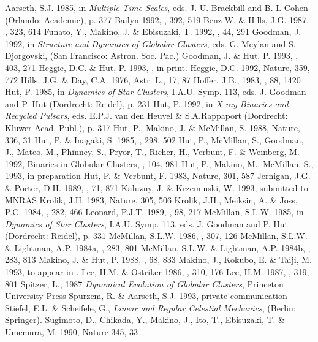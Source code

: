 \begin{references}
 Aarseth, S.J. 1985, in {\it Multiple Time Scales}, eds.
J. U. Brackbill and B. I. Cohen (Orlando: Academic), p. 377
 Bailyn 1992, \apj, 392, 519
 Benz W. \& Hills, J.G. 1987, \apj, 323, 614
 Funato, Y., Makino, J. \& Ebisuzaki, T. 1992, \pasj, 44, 291
 Goodman, J. 1992, in {\it Structure and Dynamics of
Globular Clusters}, eds. G. Meylan and S. Djorgovski, (San Francisco:
Astron. Soc. Pac.)
 Goodman, J. \& Hut, P. 1993, \apj, 403, 271
 Heggie, D.C. \& Hut, P. 1993, \apjs, in print.
 Heggie, D.C. 1992, Nature, 359, 772
 Hills, J.G. \& Day, C.A. 1976, Astr. L., 17, 87
 Hoffer, J.B., 1983, \aj, 88, 1420
 Hut, P. 1985, in {\it Dynamics of Star Clusters},
I.A.U. Symp. 113, eds. J. Goodman and P. Hut (Dordrecht: Reidel), p. 231
 Hut, P. 1992, in {\it X-ray Binaries and Recycled Pulsars},
eds. E.P.J. van den Heuvel \& S.A.Rappaport (Dordrecht: Kluwer Acad.
Publ.), p. 317
 Hut, P., Makino, J. \& McMillan, S. 1988, Nature, 336, 31
 Hut, P. \& Inagaki, S. 1985, \apj, 298, 502
 Hut, P., McMillan, S., Goodman, J., Mateo, M., Phinney, S.,
Pryor, T., Richer, H., Verbunt, F. \& Weinberg, M. 1992, Binaries in
Globular Clusters, \pasp, 104, 981
 Hut, P., Makino, M., McMillan, S., 1993, in preparation
 Hut, P. \& Verbunt, F. 1983, Nature, 301, 587
 Jernigan, J.G. \& Porter, D.H. 1989, \apjs, 71, 871
 Kaluzny, J. \& Krzeminski, W. 1993, submitted to MNRAS
 Krolik, J.H. 1983, Nature, 305, 506
 Krolik, J.H., Meiksin, A. \& Joss, P.C. 1984, \apj, 282, 466
 Leonard, P.J.T. 1989, \aj, 98, 217
 McMillan, S.L.W. 1985, in {\it Dynamics of Star Clusters},
I.A.U. Symp. 113, eds. J. Goodman and P. Hut (Dordrecht: Reidel), p. 331
 McMillan, S.L.W. 1986, \apj, 307, 126
 McMillan, S.L.W. \& Lightman, A.P. 1984a, \apj, 283, 801
 McMillan, S.L.W. \& Lightman, A.P. 1984b, \apj, 283, 813
 Makino, J. \& Hut, P. 1988, \apjs, 68, 833
 Makino, J., Kokubo, E. \& Taiji, M. 1993, to appear in \pasj.
 Lee, H.M. \& Ostriker 1986, \apj, 310, 176
 Lee, H.M. 1987, \apj, 319, 801
 Spitzer, L., 1987 {\it Dynamical Evolution of Globular
Clusters}, Princeton University Press
 Spurzem, R. \& Aarseth, S.J. 1993, private communication
 Stiefel, E.L. \& Scheifele, G., {\it Linear and Regular
Celestial Mechanics}, (Berlin: Springer).
 Sugimoto, D., Chikada, Y., Makino, J., Ito, T., Ebisuzaki,
T. \& Umemura, M. 1990, Nature 345, 33

\end{references}


